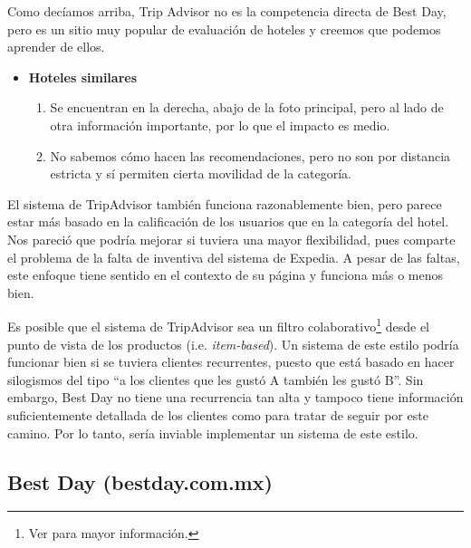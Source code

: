 \documentclass[12pt]{report}
\begin{document}
Como decíamos arriba, Trip Advisor no es la competencia directa de Best Day, pero es un sitio muy popular de evaluación de hoteles y creemos que podemos aprender de ellos.
\begin{itemize}
	\item \textbf{Hoteles similares}
	\begin{enumerate}
		\item Se encuentran en la derecha, abajo de la foto principal, pero al lado de otra información importante, por lo que el impacto es medio.
		\item No sabemos cómo hacen las recomendaciones, pero no son por distancia estricta y sí permiten cierta movilidad de la categoría.
	\end{enumerate}
\end{itemize}
El sistema de TripAdvisor también funciona razonablemente bien, pero parece estar más basado en la calificación de los usuarios que en la categoría del hotel. Nos pareció que podría mejorar si tuviera una mayor flexibilidad, pues comparte el problema de la falta de inventiva del sistema de Expedia. A pesar de las faltas, este enfoque tiene sentido en el contexto de su página y funciona más o menos bien.

Es posible que el sistema de TripAdvisor sea un filtro colaborativo\footnote{Ver \cite{mmds} para mayor información.} desde el punto de vista de los productos (i.e. \emph{item-based}). Un sistema de este estilo podría funcionar bien si se tuviera clientes recurrentes, puesto que está basado en hacer silogismos del tipo ``a los clientes que les gustó A también les gustó B''. Sin embargo, Best Day no tiene una recurrencia tan alta y tampoco tiene información suficientemente detallada de los clientes como para tratar de seguir por este camino. Por lo tanto, sería inviable implementar un sistema de este estilo.


\subsection*{Best Day (bestday.com.mx)}
\end{document}
